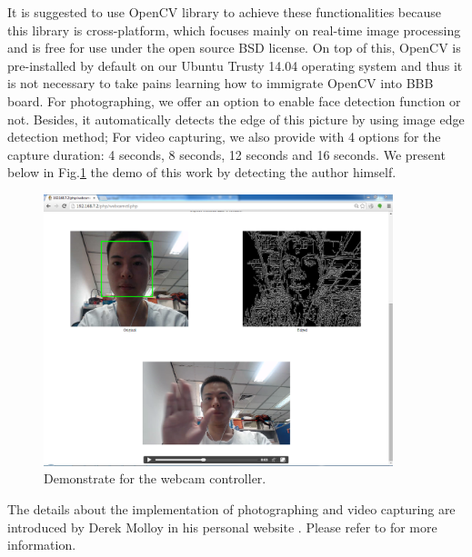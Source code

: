 \documentclass[12pt,journal,draftclsnofoot,onecolumn]{IEEEtran}
\begin{document}
It is suggested to use OpenCV library to achieve these functionalities because this library is cross-platform, which focuses mainly on real-time image processing and is free for use under the open source BSD license.
On top of this, OpenCV is pre-installed by default on our Ubuntu Trusty 14.04 operating system and thus it is not necessary to take pains learning how to immigrate OpenCV into BBB board. For photographing, we offer an option to enable face detection function or not. Besides, it automatically detects the edge of this picture by using image edge detection method;  For video capturing, we also provide with 4 options for the capture duration: 4 seconds, 8 seconds, 12 seconds and 16 seconds.  We present below in Fig.\ref{webcamdemo} the demo of this work by detecting the author himself.
\begin{figure}[htb]
	\centering
	\includegraphics[width=4in]{./figs/webcam3.PNG}
	\caption{Demonstrate for the webcam controller.}
	\label{webcamdemo}
\end{figure}

The details about the implementation of photographing and video capturing are introduced by Derek Molloy in his personal website \cite{molloy}. Please refer to \cite{molloy_videocapture,facedetection} for more information.
%
%
\end{document}
